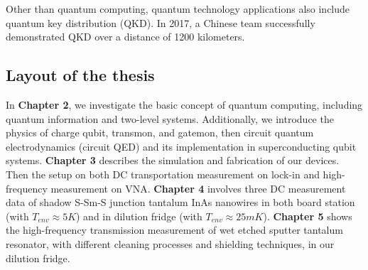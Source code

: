 Other than quantum computing, quantum technology applications also include quantum key distribution (QKD). In 2017, a Chinese team \cite{RN58} successfully demonstrated QKD over a distance of 1200 kilometers.

\subsection{Layout of the thesis}
In \textbf{Chapter 2}, we investigate the basic concept of quantum computing, including quantum information and two-level systems. Additionally, we introduce the physics of charge qubit, transmon, and gatemon, then circuit quantum electrodynamics (circuit QED) and its implementation in superconducting qubit systems. \textbf{Chapter 3} describes the simulation and fabrication of our devices. Then the setup on both DC transportation measurement on lock-in and high-frequency measurement on VNA. \textbf{Chapter 4} involves three DC measurement data of shadow S-Sm-S junction tantalum InAs nanowires in both board station (with $T_{env} \approx 5 K$) and in dilution fridge (with $T_{env} \approx 25 mK$). \textbf{Chapter 5} shows the high-frequency transmission measurement of wet etched sputter tantalum resonator, with different cleaning processes and shielding techniques, in our dilution fridge.